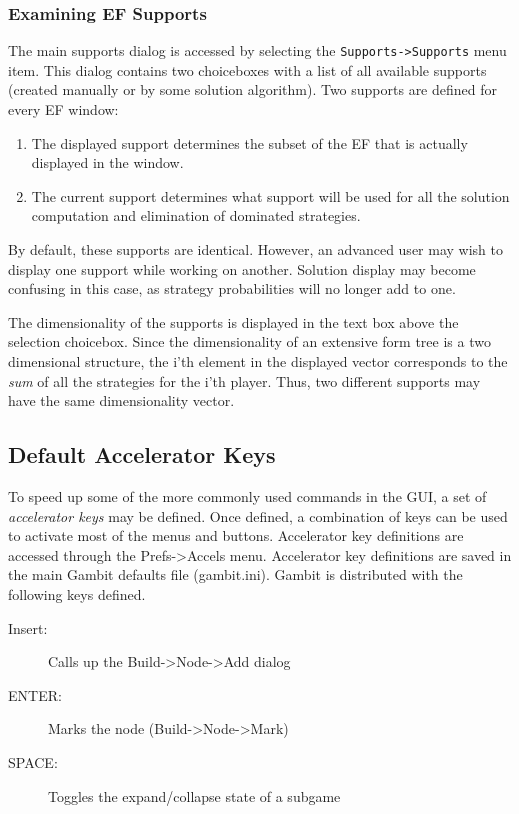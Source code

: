 \subsubsection{Examining EF Supports}\label{efsuptexam}
The main supports dialog is accessed by selecting the {\tt Supports->Supports} 
menu item.  This dialog
contains two choiceboxes with a list of all available supports (created manually or 
by some solution algorithm).
Two supports are defined for every EF window:
\begin{enumerate}
\item The displayed support determines the subset of the EF that is actually
displayed in the window.
\item The current support determines what support will be used for all the solution
computation and elimination of dominated strategies. 
\end{enumerate}
By default, these supports are identical.  However, an advanced user may wish to
display one support while working on another.  Solution display may become 
confusing in this case, as strategy probabilities will no longer add to one.  

The dimensionality of the supports is displayed in the text box above the selection
choicebox.  Since the dimensionality of an extensive form tree is a two dimensional structure,
the i'th element in the displayed vector corresponds to the {\em sum} of all the strategies
for the i'th player.  Thus, two different supports may have the same dimensionality vector.


\subsection{Default Accelerator Keys}\label{ExtFormDefAccl}
To speed up some of the more commonly used commands in the GUI, a set of
{\em accelerator keys} may be defined.  Once defined, a combination of keys
can be used to activate most of the menus and buttons.  Accelerator key
definitions are accessed through the Prefs->Accels menu.  Accelerator key
definitions are saved in the main Gambit defaults file (gambit.ini).  Gambit
is distributed with the following keys defined.
\begin{description}
\item[Insert:] Calls up the Build->Node->Add dialog
\item[ENTER:] Marks the node (Build->Node->Mark)
\item[SPACE:] Toggles the expand/collapse state of a subgame
\end{description}

